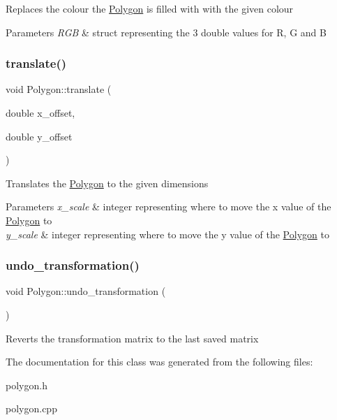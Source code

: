 Replaces the colour the \mbox{\hyperlink{class_polygon}{Polygon}} is filled with with the given colour 
\begin{DoxyParams}{Parameters}
{\em R\+GB} & struct representing the 3 double values for R, G and B \\
\hline
\end{DoxyParams}
\mbox{\label{class_polygon_a8981ae2ebe960a7355134f03dc88f1e3}} 
\subsubsection{\texorpdfstring{translate()}{translate()}}
{\footnotesize\ttfamily void Polygon\+::translate (\begin{DoxyParamCaption}\item[{double}]{x\+\_\+offset,  }\item[{double}]{y\+\_\+offset }\end{DoxyParamCaption})}

Translates the \mbox{\hyperlink{class_polygon}{Polygon}} to the given dimensions 
\begin{DoxyParams}{Parameters}
{\em x\+\_\+scale} & integer representing where to move the x value of the \mbox{\hyperlink{class_polygon}{Polygon}} to \\
\hline
{\em y\+\_\+scale} & integer representing where to move the y value of the \mbox{\hyperlink{class_polygon}{Polygon}} to \\
\hline
\end{DoxyParams}
\mbox{\label{class_polygon_a9c058c0a82c8d8138301d2c6ec049d09}} 
\subsubsection{\texorpdfstring{undo\+\_\+transformation()}{undo\_transformation()}}
{\footnotesize\ttfamily void Polygon\+::undo\+\_\+transformation (\begin{DoxyParamCaption}{ }\end{DoxyParamCaption})}

Reverts the transformation matrix to the last saved matrix 

The documentation for this class was generated from the following files\+:\begin{DoxyCompactItemize}
\item 
polygon.\+h\item 
polygon.\+cpp\end{DoxyCompactItemize}
